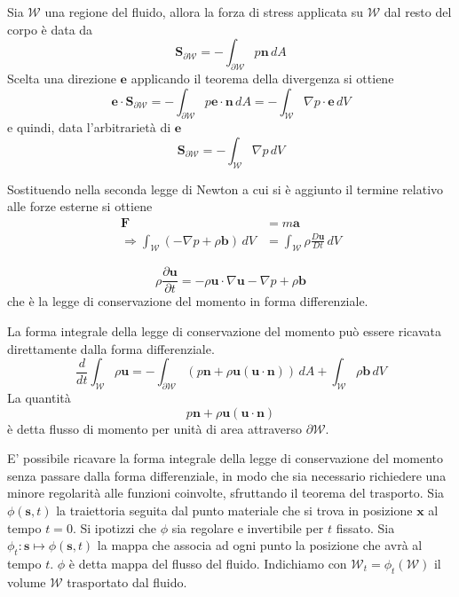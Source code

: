 Sia $\mathcal{W}$ una regione del fluido, allora la forza di stress applicata su $\mathcal{W}$ dal resto del corpo è data da
\begin{equation*}
\mathbf{S}_{\partial\mathcal{W}} = - \int_{\partial\mathcal{W}} p\mathbf{n}\,dA
\end{equation*}
Scelta una direzione $\mathbf{e}$ applicando il teorema della divergenza si ottiene
\begin{equation*}
\mathbf{e}\cdot\mathbf{S}_{\partial\mathcal{W}} = - \int_{\partial\mathcal{W}} p\mathbf{e}\cdot\mathbf{n}\,dA
                                                  = - \int_{\mathcal{W}} \nabla p \cdot \mathbf{e} \, dV
\end{equation*}
e quindi, data l'arbitrarietà di $\mathbf{e}$
\begin{equation*}
\mathbf{S}_{\partial\mathcal{W}} = - \int_{\mathcal{W}} \nabla p \, dV
\end{equation*}

Sostituendo nella seconda legge di Newton a cui si è aggiunto il termine relativo alle forze esterne si ottiene
\begin{align*}
\mathbf{F} &= m\mathbf{a} \\
\Rightarrow \int_{\mathcal{W}}\left(-\nabla p + \rho\mathbf{b}\right)\, dV &= \int_{\mathcal{W}}\rho\frac{D\mathbf{u}}{Dt}\, dV
\end{align*}

\begin{equation}\label{eq:conservazione momento differenziale}
\boxed{
\rho \frac{\partial \mathbf{u}}{\partial t} = - \rho \mathbf{u} \cdot \nabla \mathbf{u} - \nabla p + \rho \mathbf{b}
}
\end{equation}
che è la legge di conservazione del momento in forma differenziale.

La forma integrale della legge di conservazione del momento può essere ricavata direttamente dalla forma differenziale.
\begin{equation}
\boxed{
\frac{d}{dt}\int_{\mathcal{W}}\rho \mathbf{u} = - \int_{\partial\mathcal{W}}(p\mathbf{n}+\rho\mathbf{u}(\mathbf{u} \cdot \mathbf{n})) \, dA + \int_{\mathcal{W}}\rho\mathbf{b}\, dV
}  
\end{equation}
La quantità
\begin{equation*}
p\mathbf{n}+\rho\mathbf{u}(\mathbf{u}\cdot\mathbf{n})
\end{equation*}
è detta flusso di momento per unità di area attraverso $\partial\mathcal{W}$.

E' possibile ricavare la forma integrale della legge di conservazione del momento senza passare dalla forma differenziale, in modo che sia necessario richiedere una minore regolarità alle funzioni coinvolte, sfruttando il teorema del trasporto.
Sia $\phi(\mathbf{s},t)$ la traiettoria seguita dal punto materiale che si trova in posizione $\mathbf{x}$ al tempo $t=0$. Si ipotizzi che $\phi$ sia regolare e invertibile per $t$ fissato. Sia $\phi_t:\mathbf{s}\mapsto\phi (\mathbf{s},t)$ la mappa che associa ad ogni punto la posizione che avrà al tempo $t$. $\phi$ è detta mappa del flusso del fluido. Indichiamo con $\mathcal{W}_t = \phi_t(\mathcal{W})$ il volume $\mathcal{W}$ trasportato dal fluido.

